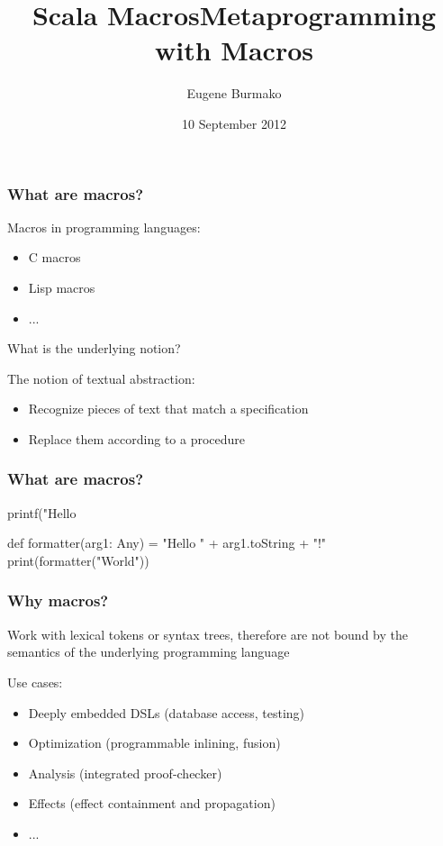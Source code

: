 \documentclass[svgnames,hyperref={bookmarks=false}]{beamer}
\title{Scala Macros}
\begin{document}
\title{Metaprogramming with Macros}
\author{Eugene Burmako}
\date{10 September 2012}
{
\begin{frame}
  \titlepage
\end{frame}
}

\begin{frame}[fragile]
\frametitle{What are macros?}
Macros in programming languages:
\begin{itemize}
\item C macros
\item Lisp macros
\item ...
\end{itemize}

\vskip25pt
What is the underlying notion?
\vskip25pt
\pause

The notion of textual abstraction:
\begin{itemize}
\item Recognize pieces of text that match a specification
\item Replace them according to a procedure
\end{itemize}
\end{frame}

\begin{frame}[fragile]
\frametitle{What are macros?}
\begin{semiverbatim}
printf("Hello %
\end{semiverbatim}

\hskip70pt

\begin{semiverbatim}
def formatter(arg1: Any) = "Hello " + arg1.toString + "!"
print(formatter("World"))
\end{semiverbatim}
\end{frame}

\begin{frame}[fragile]
\frametitle{Why macros?}

Work with lexical tokens or syntax trees, therefore are not bound by the semantics of the underlying
programming language

Use cases:
\begin{itemize}
\item Deeply embedded DSLs (database access, testing)
\item Optimization (programmable inlining, fusion)
\item Analysis (integrated proof-checker)
\item Effects (effect containment and propagation)
\item ...
\end{itemize}
\end{frame}
\end{document}
